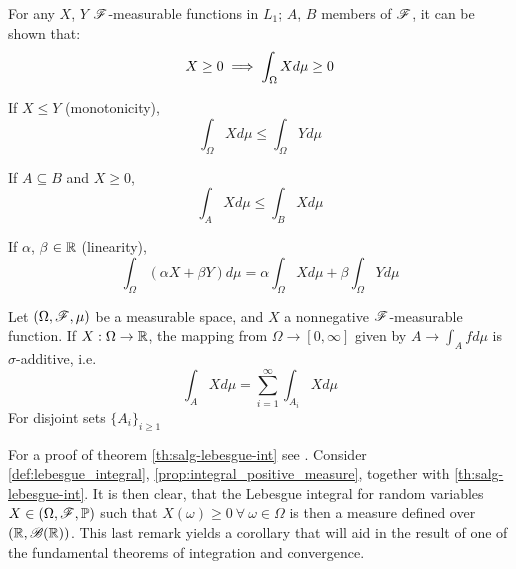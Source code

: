 \documentclass[../TGMAFFIRO.tex]{subfiles}
\begin{document}
\begin{proposition} \label{prop:lebesgue_integral_props}
	For any $X$, $Y$ $\mathscr{F}$-measurable functions in $L_1$; $A$, $B$ members of $\mathscr{F}$, it can be shown that:
	\begin{equation}\label{prop:integral_positive_measure}
		X \geq 0 \implies \int_\Omega X d\mu \geq 0 \\
	\end{equation}
	
	If $X \leq Y$ (monotonicity),
	\begin{equation}
		\int_\Omega X d\mu \leq \int_\Omega Y d\mu
	\end{equation}
	
	If $A \subseteq B$ and $X \geq 0$,
	\begin{equation}
		\int_A X d\mu \leq \int_B X d\mu
	\end{equation}
	
	If $\alpha$, $\beta$ $\in \mathbb{R}$ (linearity),
	\begin{equation}
	\int_\Omega (\alpha X + \beta Y) d\mu = \alpha \int_\Omega X d\mu + \beta \int_\Omega Y d\mu
	\end{equation}
\end{proposition}


\begin{theorem} \label{th:salg-lebesgue-int}
	Let $(\Omega, \mathscr{F}, \mu)$ be a measurable space, and $X$ a nonnegative $\mathscr{F}$-measurable function. If $X: \Omega \to \mathbb{R}$, the mapping from $\Omega \to [0, \infty]$ given by $A \to \int_A f d\mu$ is $\sigma$-additive, i.e.
	\begin{equation}
		\int_A X d\mu = \sum_{i=1}^{\infty}\int_{A_i} X d\mu
	\end{equation}
	For disjoint sets $\{A_i\}_{i\geq1}$
\end{theorem}

For a proof of theorem \ref{th:salg-lebesgue-int} see . Consider \ref{def:lebesgue_integral}, \ref{prop:integral_positive_measure}, together with \ref{th:salg-lebesgue-int}. It is then clear, that the Lebesgue integral for random variables $X \in (\Omega, \mathscr{F}, \mathbb{P})$ such that $X(\omega) \geq 0 \ \forall \ \omega \in \Omega$ is then a measure defined over $(\mathbb{R}, \mathscr{B}(\mathbb{R}))$. This last remark yields a corollary that will aid in the result of one of the fundamental theorems of integration and convergence. 
\end{document}
